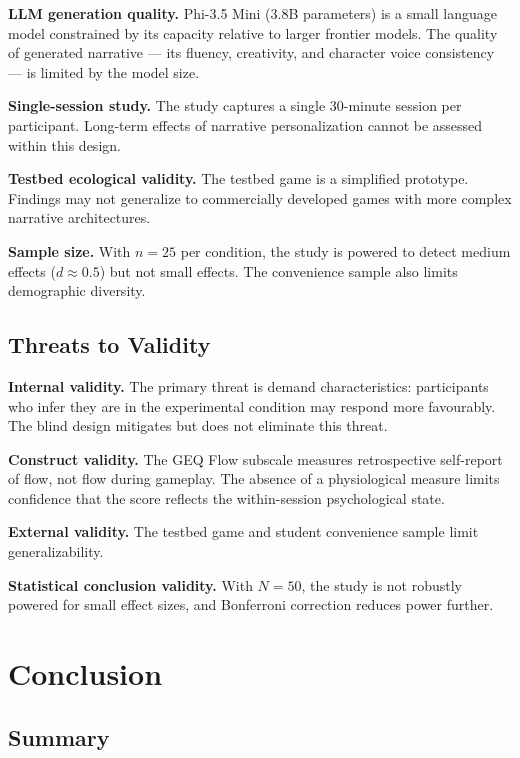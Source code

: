 \documentclass[12pt,a4paper]{report}
\begin{document}
\textbf{LLM generation quality.} Phi-3.5 Mini (3.8B parameters) is a small language model constrained by its capacity relative to larger frontier models. The quality of generated narrative --- its fluency, creativity, and character voice consistency --- is limited by the model size.

\textbf{Single-session study.} The study captures a single 30-minute session per participant. Long-term effects of narrative personalization cannot be assessed within this design.

\textbf{Testbed ecological validity.} The testbed game is a simplified prototype. Findings may not generalize to commercially developed games with more complex narrative architectures.

\textbf{Sample size.} With $n = 25$ per condition, the study is powered to detect medium effects ($d \approx 0.5$) but not small effects. The convenience sample also limits demographic diversity.

\section{Threats to Validity}

\textbf{Internal validity.} The primary threat is demand characteristics: participants who infer they are in the experimental condition may respond more favourably. The blind design mitigates but does not eliminate this threat.

\textbf{Construct validity.} The GEQ Flow subscale measures retrospective self-report of flow, not flow during gameplay. The absence of a physiological measure limits confidence that the score reflects the within-session psychological state.

\textbf{External validity.} The testbed game and student convenience sample limit generalizability.

\textbf{Statistical conclusion validity.} With $N = 50$, the study is not robustly powered for small effect sizes, and Bonferroni correction reduces power further.


\chapter{Conclusion}

\section{Summary}
\end{document}
